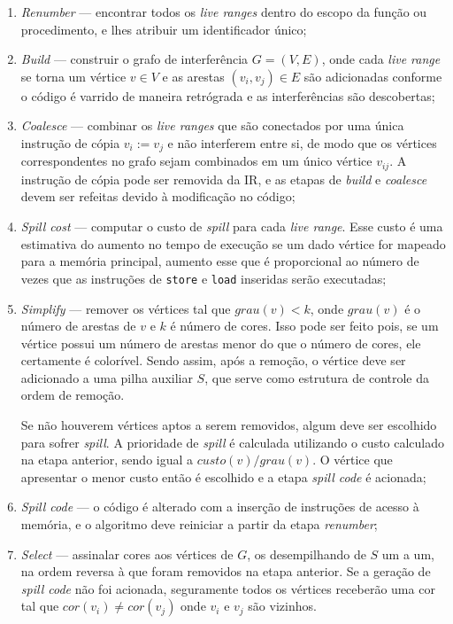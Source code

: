 \documentclass[
	12pt,				%
	openright,			%
	oneside,			%
	a4paper,			%
	tccpreliminar,			%
	]{ABNT-DC-UEL}
\begin{document}
\begin{enumerate}
    \item \textit{Renumber} --- encontrar todos os \textit{live ranges} dentro do escopo da função ou procedimento, e lhes atribuir um identificador único;
    \item \textit{Build} --- construir o grafo de interferência $G = (V,E)$, onde cada \textit{live range} se torna um vértice $v\in 
    V$ e as arestas $(v_i,v_j)\in E$ são adicionadas conforme o código é varrido de maneira retrógrada e as interferências são descobertas;
    \item \textit{Coalesce} --- combinar os \textit{live ranges} que são conectados por uma única instrução de cópia $v_i:=v_j$ e não interferem entre si, de modo que os vértices correspondentes no grafo sejam combinados em um único vértice $v_{ij}$. A instrução de cópia pode ser removida da IR, e as etapas de \textit{build} e \textit{coalesce} devem ser refeitas devido à modificação no código;
    \item \textit{Spill cost} --- computar o custo de \textit{spill} para cada \textit{live range}. Esse custo é uma estimativa do aumento no tempo de execução se um dado vértice for mapeado para a memória principal, aumento esse que é proporcional ao número de vezes que as instruções de \texttt{store} e \texttt{load} inseridas serão executadas;
    \item \textit{Simplify} --- remover os vértices tal que $grau(v)<k$, onde $grau(v)$ é o número de arestas de $v$ e $k$ é número de cores. Isso pode ser feito pois, se um vértice possui um número de arestas menor do que o número de cores, ele certamente é colorível. Sendo assim, após a remoção, o vértice deve ser adicionado a uma pilha auxiliar $S$, que serve como estrutura de controle da ordem de remoção.
    
    Se não houverem vértices aptos a serem removidos, algum deve ser escolhido para sofrer \textit{spill}. A prioridade de \textit{spill} é calculada utilizando o custo calculado na etapa anterior, sendo igual a $custo(v)/grau(v)$. O vértice que apresentar o menor custo então é escolhido e a etapa \textit{spill code} é acionada; 
    \item \textit{Spill code} --- o código é alterado com a inserção de instruções de acesso à memória, e o algoritmo deve reiniciar a partir da etapa \textit{renumber};
    \item \textit{Select} --- assinalar cores aos vértices de $G$, os desempilhando de $S$ um a um, na ordem reversa à que foram removidos na etapa anterior. Se a geração de \textit{spill code} não foi acionada, seguramente todos os vértices receberão uma cor tal que $cor(v_i)\ne cor(v_j)$ onde $v_i$ e $v_j$ são vizinhos.
\end{enumerate}
\end{document}

